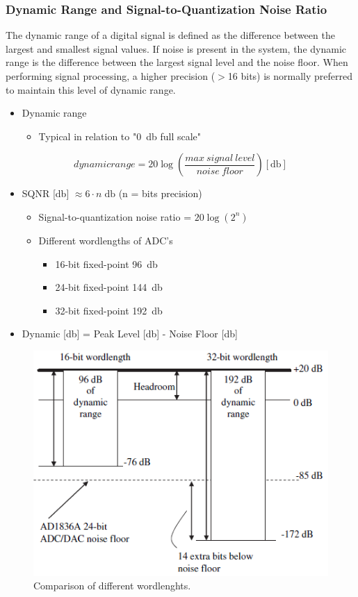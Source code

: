 \subsubsection{Dynamic Range and Signal-to-Quantization Noise Ratio}
The dynamic range of a digital signal is defined as the difference between the largest and smallest signal values.
If noise is present in the system, the dynamic range is the difference between the largest signal level and the noise floor.
When performing signal processing, a higher precision ($>$16 bits) is normally preferred to maintain this level of dynamic range.
\begin{itemize}
	\item Dynamic range
	\begin{itemize}
		\item Typical in relation to "\SI{0}{\decibel} full scale"
	\end{itemize}
\end{itemize}
\begin{equation}
dynamic range = 20\log(\frac{max \: signal \: level}{noise \: floor}) [\si{\decibel}]
\end{equation}
\begin{itemize}
	\item SQNR [\si{\decibel}] $\approx 6\cdot n \;\si{\decibel}$ (n = bits precision)
	\begin{itemize}
		\item Signal-to-quantization noise ratio = $20\log(2^n)$
		\item Different wordlengths of ADC's
		\begin{itemize}
			\item 16-bit fixed-point \SI{96}{\decibel}
			\item 24-bit fixed-point \SI{144}{\decibel}
			\item 32-bit fixed-point \SI{192}{\decibel}
		\end{itemize}
	\end{itemize} 
	\item Dynamic [\si{\decibel}] = Peak Level [\si{\decibel}] - Noise Floor [\si{\decibel}]
\end{itemize}

\begin{figure} [H]
	\centering
	\includegraphics[width=0.85\linewidth]{graphics/9.png}
	\caption{Comparison of different wordlenghts.}
	\label{fig:9}
\end{figure}

